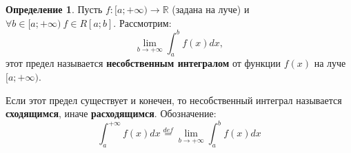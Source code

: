 \documentclass{report}
\theoremstyle{definition}
\newtheorem*{definition}{Определение}
\begin{document}
\begin{definition}
    Пусть $f:[a;+\infty)\rightarrow\mathbb{R}$ (задана на луче) и $\forall b \in [a;+\infty) \ f\in R[a;b]$.
    Рассмотрим:
    \begin{equation*}
        \underset{b\rightarrow+\infty}{\lim}\int_{a}^{b}f(x)dx,
    \end{equation*}
    этот предел называется \textbf{несобственным интегралом} от функции $f(x)$ на луче $[a;+\infty)$.

    Если этот предел существует и конечен, то несобственный интеграл называется \textbf{сходящимся}, иначе
    \textbf{расходящимся}. Обозначение:
    \begin{equation*}
        \int_{a}^{+\infty}f(x)dx \overset{def}{=}\underset{b\rightarrow+\infty}{\lim}\int_{a}^{b}f(x)dx
    \end{equation*}
\end{definition}
\end{document}
